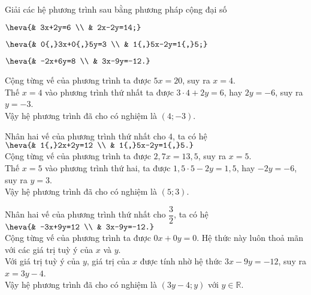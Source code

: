 \begin{bt}
	Giải các hệ phương trình sau bằng phương pháp cộng đại số
	\begin{listEX}[3]
	\item $\heva{& 3x+2y=6 \\ & 2x-2y=14;}$
	\item $\heva{& 0{,}3x+0{,}5y=3 \\ & 1{,}5x-2y=1{,}5;}$
	\item $\heva{& -2x+6y=8 \\ & 3x-9y=-12.}$
	\end{listEX}
	\loigiai
	{
	\begin{listEX}[1]
	\item Cộng từng vế của phương trình ta được $5x=20$, suy ra $x=4$.\\
	Thế $x=4$ vào phương trình thứ nhất ta được $3\cdot4+2y=6$, hay $2y=-6$, suy ra $y=-3$.\\
	Vậy hệ phương trình đã cho có nghiệm là $(4;-3)$.
	\item Nhân hai vế của phương trình thứ nhất cho $4$, ta có hệ $\heva{& 1{,}2x+2y=12 \\ & 1{,}5x-2y=1{,}5.}$\\
	Cộng từng vế của phương trình ta được $2{,}7x=13{,}5$, suy ra $x=5$.\\
	Thế $x=5$ vào phương trình thứ hai, ta được $1{,}5\cdot5-2y=1{,}5$, hay $-2y=-6$, suy ra $y=3$.\\
	Vậy hệ phương trình đã cho có nghiệm là $(5;3)$.
	\item Nhân hai vế của phương trình thứ nhất cho $\dfrac{3}{2}$, ta có hệ $\heva{& -3x+9y=12 \\ & 3x-9y=-12.}$\\
	Cộng từng vế của phương trình ta được $0x+0y=0$. Hệ thức này luôn thoả mãn với các giá trị tuỳ ý của $x$ và $y$.\\
	Với giá trị tuỳ ý của $y$, giá trị của $x$ được tính nhờ hệ thức $3x-9y=-12$, suy ra $x=3y-4$.\\
	Vậy hệ phương trình đã cho có nghiệm là $(3y-4;y)$ với $y\in\mathbb{R}$.
	\end{listEX}
	}
\end{bt}
